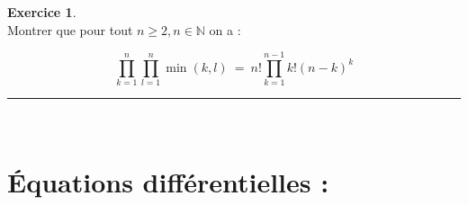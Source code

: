 \documentclass[10pt,a4paper]{article}
\newcommand{\N}{\mathbb{N}}
\theoremstyle{definition}
\theoremstyle{definition}
\newtheorem{exo}{Exercice}
\begin{document}
\begin{center}
\begin{minipage}[t]{0.47\linewidth}
\begin{exo}\quad\\
Montrer que pour tout $n\geq 2, n\in\N$ on a :

$$\prod\limits_{k=1}^{n}\prod\limits_{l=1}^{n} \min(k,l) \ = \ n!\prod\limits_{k=1}^{n-1}k!(n-k)^{k}$$



\end{exo}
\begin{center}
\rule{1\linewidth}{0.6pt}
\end{center}




	\end{minipage}
\end{center}
\quad\\
\section*{Équations différentielles :}
\end{document}
